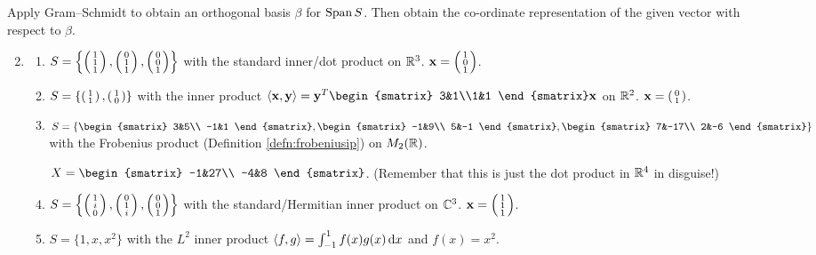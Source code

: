 \begin{exercises}{}{}
	\exstart Apply Gram--Schmidt to obtain an orthogonal basis $\beta$ for $\operatorname{Span} S$. Then obtain the co-ordinate representation of the given vector with respect to $\beta$.
	
	\begin{enumerate}\setcounter{enumi}{1}
	  \item[]\begin{enumerate}
	    \item $S=\left\{\left(\begin{smallmatrix}1\\1\\1\end{smallmatrix}\right),\left(\begin{smallmatrix}0\\1\\1\end{smallmatrix}\right),\left(\begin{smallmatrix}0\\0\\1\end{smallmatrix}\right)\right\}$ with the standard inner/dot product on $\mathbb{R}^3$. ${\mathbf{x}}=\left(\begin{smallmatrix}1\\0\\1\end{smallmatrix}\right)$.
	    
	    \item $S=\left\{\left(\begin{smallmatrix}1\\1\end{smallmatrix}\right),\left(\begin{smallmatrix}1\\0\end{smallmatrix}\right)\right\}$ with the inner product $\ip{\vx,\vy}=\vy^T
	    \begin{smatrix}
	    	3&1\\1&1
	    \end{smatrix}\vx$ on $\mathbb{R}^2$. ${\mathbf{x}}=\left(\begin{smallmatrix}0\\1\end{smallmatrix}\right)$.
	    
	    \item $S=\left\{
	    \begin{smatrix}
	    	3&5\\
	    	-1&1
	    \end{smatrix},
	    \begin{smatrix}
	    	-1&9\\
	    	5&-1
	    \end{smatrix},
	    \begin{smatrix}
	    	7&-17\\
	    	2&-6
	    \end{smatrix}
	    \right\}$ with the Frobenius product (Definition \ref{defn:frobeniusip}) on $M_2(\mathbb{R})$.\par
	    $X=
	    \begin{smatrix}
	    	-1&27\\
	    	-4&8
	    \end{smatrix}$. (Remember that this is just the dot product in $\mathbb{R}^4$ in disguise!)
	    
	    \item $S=\left\{\left(\begin{smallmatrix}1\\i\\0\end{smallmatrix}\right),\left(\begin{smallmatrix}0\\1\\i\end{smallmatrix}\right),\left(\begin{smallmatrix}0\\0\\1\end{smallmatrix}\right)\right\}$ with the standard/Hermitian inner product on $\mathbb{C}^3$. ${\mathbf{x}}=\left(\begin{smallmatrix}1\\1\\1\end{smallmatrix}\right)$.
	    
	    \item $S=\{1,x,x^2\}$ with the $L^2$ inner product $\left\langle f,g\right\rangle=\int_{-1}^1f(x)g(x)\,{\mathrm{d} x}$ and $f(x)=x^2$.
	  \end{enumerate}
	  

\end{enumerate}
\end{exercises}
